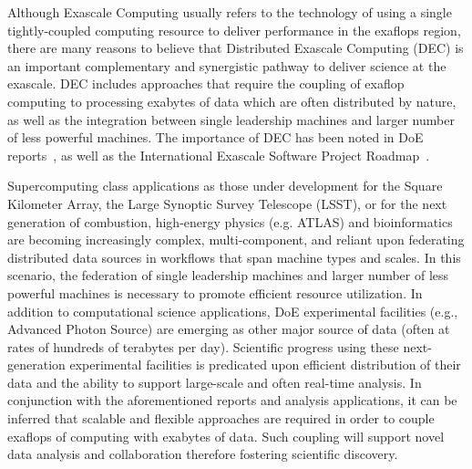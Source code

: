 \documentclass[11pt,final]{article}
\newcommand{\msnote}[1]{ {\textcolor{green} { ***Mark: #1 }}}
\newcommand{\mtnote}[1]{ {\textcolor{cyan} { ***Matteo: #1 }}}
\newcommand{\msnote}[1]{}
\newcommand{\mtnote}[1]{}
\begin{document}
{
Although Exascale Computing usually refers to the technology of using
a single tightly-coupled computing resource to deliver performance in
the exaflops region, there are many reasons to believe that
Distributed Exascale Computing (DEC) is an important complementary and
synergistic pathway to deliver science at the exascale.  DEC includes
approaches that require the coupling of exaflop computing to
processing exabytes of data which are often distributed by nature, as
well as the integration between single leadership machines and larger
number of less powerful machines. The importance of DEC has been noted
in DoE reports~\cite{dmav-exa}, as well as the International Exascale
Software Project Roadmap~\cite{iespr}.


Supercomputing class applications as those under development for the
Square Kilometer Array, the Large Synoptic Survey Telescope (LSST), or
for the next generation of combustion, high-energy physics
(e.g. ATLAS) and bioinformatics are becoming increasingly complex,
multi-component, and reliant upon federating distributed data sources
in workflows that span machine types and scales.  In this scenario,
the federation of single leadership machines and larger number of less
powerful machines is necessary to promote efficient resource
utilization.  In addition to computational science applications, DoE
experimental facilities (e.g., Advanced Photon Source) are emerging as
other major source of data (often at rates of hundreds of terabytes
per day).  Scientific progress using these next-generation
experimental facilities is predicated upon efficient distribution of
their data and the ability to support large-scale and often real-time
analysis.  In conjunction with the aforementioned reports and analysis
applications, it can be inferred that scalable and flexible approaches
are required in order to couple exaflops of computing with exabytes of
data. Such coupling will support novel data analysis and collaboration
therefore fostering scientific discovery.



}
\end{document}
